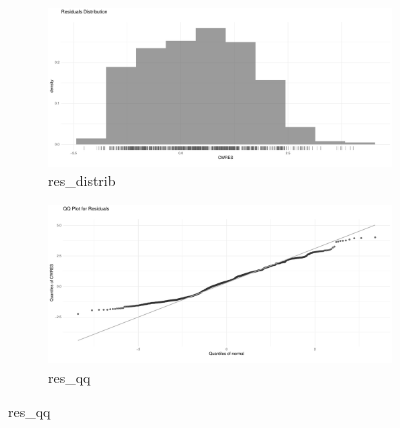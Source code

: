 \begin{figure}
\centering
    \begin{subfigure}[b]{0.45\linewidth}
        \centering
        \includegraphics[width=\linewidth]{fig/img/Xpose/res_distrib.pdf}
        \caption{res\_distrib}
        \label{fig:res_distrib}
    \end{subfigure}
    \hfill
    \begin{subfigure}[b]{0.45\linewidth}
        \centering
        \includegraphics[width=\linewidth]{fig/img/Xpose/res_qq.pdf}
        \caption{res\_qq}
        \label{fig:res_qq}
    \end{subfigure}

    \vspace{1em}


\end{figure}
